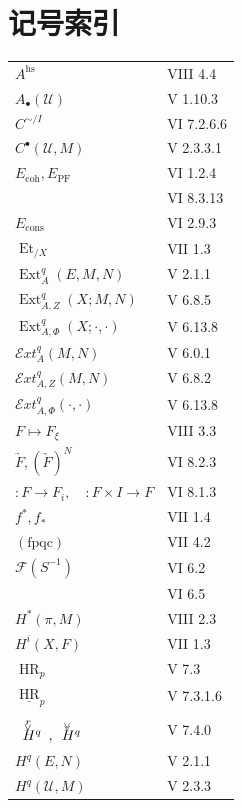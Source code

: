 \chapter*{记号索引}
\begingroup
\small
\setlength{\LTleft}{0pt}
\setlength{\LTright}{0pt}
\begin{longtable}{@{}p{.68\linewidth}p{.27\linewidth}@{}}
$A^{\mathrm{hs}}$ & VIII 4.4\\
$A_{\bullet}(\mathcal U)$ & V 1.10.3\\
$C^{\sim/I}$ & VI 7.2.6.6\\
$C^{\bullet}(\mathcal U,M)$ & V 2.3.3.1\\
$E_{\mathrm{coh}},E_{\mathrm{PF}}$ & VI 1.2.4\\
& VI 8.3.13\\
$E_{\mathrm{cons}}$ & VI 2.9.3\\
$\operatorname{Et}_{/X}$ & VII 1.3\\
$\operatorname{Ext}^{q}_{A}(E,M,N)$ & V 2.1.1\\
$\operatorname{Ext}^{q}_{A,Z}(X;M,N)$ & V 6.8.5\\
$\operatorname{Ext}^{q}_{A,\Phi}(X;\mathord\cdot,\mathord\cdot)$ & V 6.13.8\\
$\mathcal{E}\!xt^{q}_{A}(M,N)$ & V 6.0.1\\
$\mathcal{E}\!xt^{q}_{A,Z}(M,N)$ & V 6.8.2\\
$\mathcal{E}\!xt^{q}_{A,\Phi}(\mathord\cdot,\mathord\cdot)$ & V 6.13.8\\
$F\mapsto F_{\xi}$ & VIII 3.3\\
$\underrightarrow F,(\underrightarrow F)^N$ & VI 8.2.3\\
${}:F\to F_i,\quad{}:F\times I\to F$ & VI 8.1.3\\
$f^*,f_*$ & VII 1.4\\
$(\mathrm{fpqc})$ & VII 4.2\\
$\mathcal F(S^{-1})$ & VI 6.2\\
& VI 6.5\\
$H^*(\pi,M)$ & VIII 2.3\\
$H^i(X,F)$ & VII 1.3\\
$\operatorname{HR}_p$ & V 7.3\\
$\underline{\operatorname{HR}}_p$ & V 7.3.1.6\\
$\Hvr{q},\Hvv{q}$ & V 7.4.0\\
$H^q(E,N)$ & V 2.1.1\\
$H^q(\mathcal U,M)$ & V 2.3.3\\

\end{longtable}
